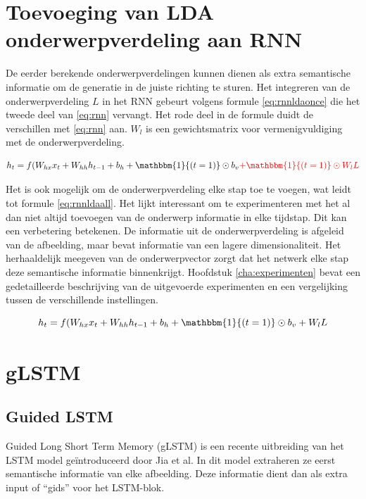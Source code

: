 \section{Toevoeging van LDA onderwerpverdeling aan RNN}
De eerder berekende onderwerpverdelingen kunnen dienen als extra semantische informatie om de generatie in de juiste richting te sturen. Het integreren van de onderwerpverdeling $L$ in het RNN gebeurt volgens formule \eqref{eq:rnnldaonce} die het tweede deel van \eqref{eq:rnn} vervangt. Het rode deel in de formule duidt de verschillen met \eqref{eq:rnn} aan. $W_l$ is een gewichtsmatrix voor vermenigvuldiging met de onderwerpverdeling.

\begin{equation}
    h_t = f(W_{hx} x_{t} + W_{hh} h_{t-1} + b_h + \mathbbm{1}{(t=1)} \odot b_v \color{red}{+\mathbbm{1}{(t=1)} \odot W_lL}
    \color{black}
    \label{eq:rnnldaonce}
\end{equation}

Het is ook mogelijk om de onderwerpverdeling elke stap toe te voegen, wat leidt tot formule \eqref{eq:rnnldaall}. Het lijkt interessant om te experimenteren met het al dan niet altijd toevoegen van de onderwerp informatie in elke tijdstap. Dit kan een verbetering betekenen. De informatie uit de onderwerpverdeling is afgeleid van de afbeelding, maar bevat informatie van een lagere dimensionaliteit. Het herhaaldelijk meegeven van de onderwerpvector zorgt dat het netwerk elke stap deze semantische informatie binnenkrijgt. Hoofdstuk \ref{cha:experimenten} bevat een gedetailleerde beschrijving van de uitgevoerde experimenten en een vergelijking tussen de verschillende instellingen.

\begin{equation}
    h_t = f(W_{hx} x_{t} + W_{hh} h_{t-1} + b_h + \mathbbm{1}{(t=1)} \odot b_v + W_lL
    \label{eq:rnnldaall}
\end{equation}


\section{gLSTM}
\subsection{Guided LSTM}
Guided Long Short Term Memory (gLSTM) is een recente uitbreiding van het LSTM model ge\"introduceerd door Jia et al.\cite{Fernando2015} In dit model extraheren ze eerst semantische informatie van elke afbeelding. Deze informatie dient dan als extra input of ``gids'' voor het LSTM-blok.

